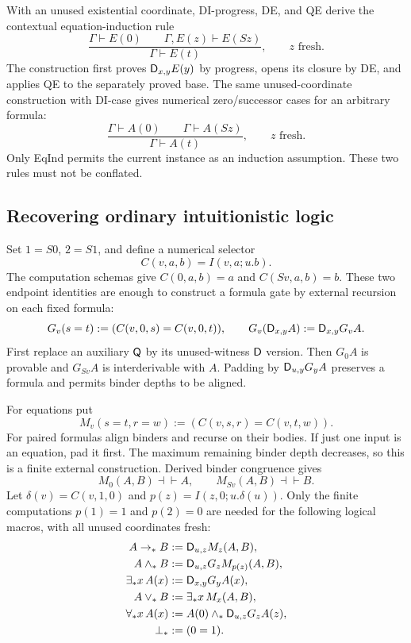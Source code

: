 With an unused existential coordinate, DI-progress, DE, and QE derive
the contextual equation-induction rule
\[
 \frac{\Gamma\vdash E(0)\qquad\Gamma,E(z)\vdash E(Sz)}
      {\Gamma\vdash E(t)},
 \qquad z\text{ fresh}.
 \tag{EqInd}\label{eq:new-eqind}
\]
The construction first proves $\mathsf D_{x,y}E(y)$ by progress, opens its
closure by DE, and applies QE to the separately proved base. The
same unused-coordinate construction with DI-case gives numerical
zero/successor cases for an arbitrary formula:
\[
 \frac{\Gamma\vdash A(0)\qquad\Gamma\vdash A(Sz)}
      {\Gamma\vdash A(t)},
 \qquad z\text{ fresh}.
 \tag{Cases}\label{eq:new-cases}
\]
Only EqInd permits the current instance as an induction assumption.
These two rules must not be conflated.

\subsection{Recovering ordinary intuitionistic logic}

Set $1=S0$, $2=S1$, and define a numerical selector
\[
 C(v,a,b)=I(v,a;u.b).
\]
The computation schemas give $C(0,a,b)=a$ and $C(Sv,a,b)=b$.
These two endpoint identities are enough to construct a formula gate
by external recursion on each fixed formula:
\[
 G_v(s=t):=(C(v,0,s)=C(v,0,t)),\qquad
 G_v(\mathsf D_{x,y}A):=\mathsf D_{x,y}G_vA.
\]
First replace an auxiliary $\mathsf Q$ by its unused-witness $\mathsf D$ version.
Then $G_0A$ is provable and $G_{Sv}A$ is interderivable with $A$.
Padding by $\mathsf D_{u,y}G_yA$ preserves a formula and permits binder
depths to be aligned.

For equations put
\[
 M_v(s=t,r=w):=(C(v,s,r)=C(v,t,w)).
\]
For paired formulas align binders and recurse on their bodies. If just
one input is an equation, pad it first. The maximum remaining binder
depth decreases, so this is a finite external construction. Derived
binder congruence gives
\[
 M_0(A,B)\dashv\vdash A,\qquad M_{Sv}(A,B)\dashv\vdash B.
\]
Let $\delta(v)=C(v,1,0)$ and $p(z)=I(z,0;u.\delta(u))$.
Only the finite computations $p(1)=1$ and $p(2)=0$ are needed for
the following logical macros, with all unused coordinates fresh:
\begin{align*}
 A\to_*B&:=\mathsf D_{u,z}M_z(A,B),\\
 A\wedge_*B&:=\mathsf D_{u,z}G_zM_{p(z)}(A,B),\\
 \exists_*x\,A(x)&:=\mathsf D_{x,y}G_yA(x),\\
 A\vee_*B&:=\exists_*x\,M_x(A,B),\\
 \forall_*x\,A(x)&:=A(0)\wedge_*\mathsf D_{u,z}G_zA(z),\\
 \bot_*&:=(0=1).
\end{align*}

